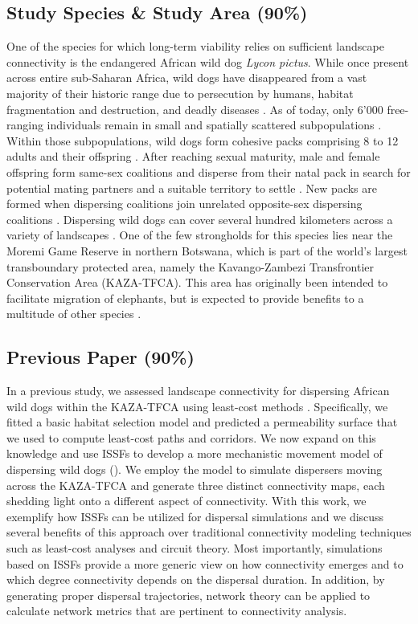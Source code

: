 \documentclass[abstract=on,10pt,a4paper,bibliography=totocnumbered]{article}
\begin{document}
\subsection{Study Species \& Study Area (90\%)}
One of the species for which long-term viability relies on sufficient landscape
connectivity is the endangered African wild dog \textit{Lycon pictus}. While
once present across entire sub-Saharan Africa, wild dogs have disappeared from a
vast majority of their historic range due to persecution by humans, habitat
fragmentation and destruction, and deadly diseases \citep{Woodroffe.2012}. As of
today, only 6'000 free-ranging individuals remain in small and spatially
scattered subpopulations \citep{Woodroffe.2012}. Within those subpopulations,
wild dogs form cohesive packs comprising 8 to 12 adults and their offspring
\cite{McNutt.1995}. After reaching sexual maturity, male and female offspring
form same-sex coalitions and disperse from their natal pack in search for
potential mating partners and a suitable territory to settle \citep{McNutt.1996,
Behr.2020}. New packs are formed when dispersing coalitions join unrelated
opposite-sex dispersing coalitions \citep{McNutt.1996}. Dispersing wild dogs can
cover several hundred kilometers across a variety of landscapes
\citep{DaviesMostert.2012, Masenga.2016, Cozzi.2020, Hofmann.2021}. One of the
few strongholds for this species lies near the Moremi Game Reserve in northern
Botswana, which is part of the world's largest transboundary protected area,
namely the Kavango-Zambezi Transfrontier Conservation Area (KAZA-TFCA). This
area has originally been intended to facilitate migration of elephants, but is
expected to provide benefits to a multitude of other species \citep{Elliot.2014,
Brennan.2020, Hofmann.2021}.

\subsection{Previous Paper (90\%)}
In a previous study, we assessed landscape connectivity for dispersing African
wild dogs within the KAZA-TFCA using least-cost methods \citep{Hofmann.2021}.
Specifically, we fitted a basic habitat selection model and predicted a
permeability surface that we used to compute least-cost paths and corridors. We
now expand on this knowledge and use ISSFs to develop a more mechanistic
movement model of dispersing wild dogs (). We employ the
model to simulate dispersers moving across the KAZA-TFCA and generate three
distinct connectivity maps, each shedding light onto a different aspect of
connectivity. With this work, we exemplify how ISSFs can be utilized for
dispersal simulations and we discuss several benefits of this approach over
traditional connectivity modeling techniques such as least-cost analyses and
circuit theory. Most importantly, simulations based on ISSFs provide a more
generic view on how connectivity emerges and to which degree connectivity
depends on the dispersal duration. In addition, by generating proper dispersal
trajectories, network theory can be applied to calculate network metrics that
are pertinent to connectivity analysis.
\end{document}
